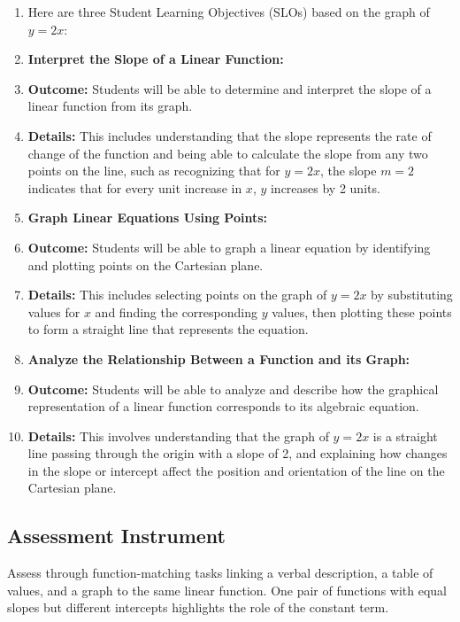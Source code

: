 \begin{enumerate}
    \item Here are three Student Learning Objectives (SLOs) based on the graph of $y = 2x$:
    \item \textbf{Interpret the Slope of a Linear Function:}
    \item \textbf{Outcome:} Students will be able to determine and interpret the slope of a linear function from its graph.
    \item \textbf{Details:} This includes understanding that the slope represents the rate of change of the function and being able to calculate the slope from any two points on the line, such as recognizing that for $y = 2x$, the slope $m = 2$ indicates that for every unit increase in $x$, $y$ increases by 2 units.
    \item \textbf{Graph Linear Equations Using Points:}
    \item \textbf{Outcome:} Students will be able to graph a linear equation by identifying and plotting points on the Cartesian plane.
    \item \textbf{Details:} This includes selecting points on the graph of $y = 2x$ by substituting values for $x$ and finding the corresponding $y$ values, then plotting these points to form a straight line that represents the equation.
    \item \textbf{Analyze the Relationship Between a Function and its Graph:}
    \item \textbf{Outcome:} Students will be able to analyze and describe how the graphical representation of a linear function corresponds to its algebraic equation.
    \item \textbf{Details:} This involves understanding that the graph of $y = 2x$ is a straight line passing through the origin with a slope of 2, and explaining how changes in the slope or intercept affect the position and orientation of the line on the Cartesian plane.
\end{enumerate}


\subsection{Assessment Instrument}
\label{ssec:asse-3669}


Assess through function-matching tasks linking a verbal description, a
table of values, and a graph to the same linear function. One pair of
functions with equal slopes but different intercepts highlights the role of
the constant term.

